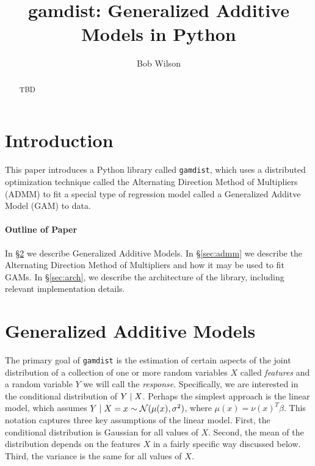 \documentclass[12pt]{article}
\title{gamdist: Generalized Additive Models in Python}
\author{Bob Wilson}
\begin{document}
\maketitle

\begin{abstract}
TBD
\end{abstract}

\newpage
\tableofcontents
\newpage

\section{Introduction}
This paper introduces a Python library called \texttt{gamdist}, which uses a distributed optimization technique called the Alternating Direction Method of Multipliers (ADMM) to fit a special type of regression model called a Generalized Additve Model (GAM)  to data. 

\paragraph{Outline of Paper} In \S\ref{sec:gam} we describe Generalized Additive Models. In \S\ref{sec:admm} we describe the Alternating Direction Method of Multipliers and how it may be used to fit GAMs. In \S\ref{sec:arch}, we describe the architecture of the library, including relevant implementation details.

\section{Generalized Additive Models}
\label{sec:gam}

The primary goal of \texttt{gamdist} is the estimation of certain aspects of the joint distribution of a collection of one or more random variables $X$ called \textit{features} and a random variable $Y$ we will call the \textit{response}. Specifically, we are interested in the conditional distribution of $Y \; | \; X$. Perhaps the simplest approach is the linear model, which assumes $Y \; | \; X = x \sim {\mathcal N} (\mu(x), \sigma^2)$, where $\mu(x) = \nu(x)^T \beta$. This notation captures three key assumptions of the linear model. First, the conditional distribution is Gaussian for all values of $X$. Second, the mean of the distribution depends on the features $X$ in a fairly specific way discussed below. Third, the variance is the same for all values of $X$.
\end{document}
